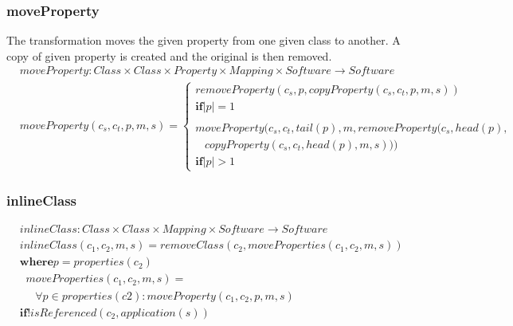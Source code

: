 \documentclass[10pt]{article}
\begin{document}
\subsubsection{moveProperty}
The transformation moves the given property from one given class to another. A copy of given property is created and the original is then removed.
\begin{align}
& moveProperty: Class \times Class \times Property \times Mapping \times Software \rightarrow Software \\
& moveProperty(c_s, c_t, p, m, s) = \begin{cases}
removeProperty(c_s, p, copyProperty(c_s, c_t, p, m, s)) \\
\mathbf{if} |p| = 1 \\\\
moveProperty(c_s, c_t, tail(p), m, removeProperty(c_s, head(p), \\ \;\;\; copyProperty(c_s, c_t, head(p), m, s))) \\ 
\mathbf{if} |p| > 1
 \end{cases}
\end{align}

\subsubsection{inlineClass}
\begin{align}
& inlineClass:  Class \times Class \times Mapping \times Software \rightarrow Software \\
& inlineClass(c_1, c_2, m, s) = removeClass(c_2, moveProperties(c_1, c_2, m, s)) \\
& \mathbf{where} p =  properties(c_2) \nonumber \\ 
& \;\; moveProperties(c_1, c_2, m, s) = \nonumber \\
& \;\; \;\;\; \forall p \in properties(c2) : moveProperty(c_1, c_2, p, m, s) \nonumber \\
& \mathbf{if} !isReferenced(c_2, application(s))
\end{align}
\end{document}
